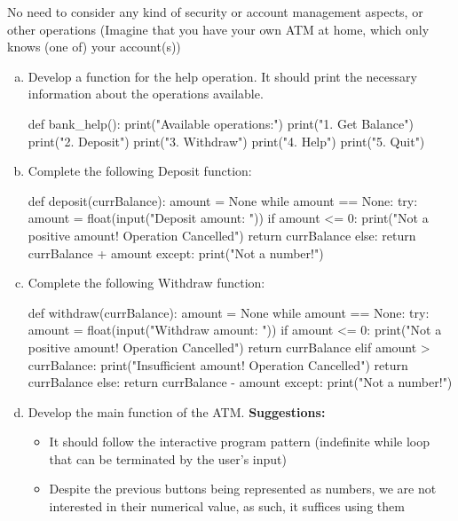 \documentclass[12pt]{article}
\begin{document}
\vspace{-6mm}

\noindent No need to consider any kind of security or account management 
aspects, or other operations (Imagine that you have your own ATM at home, which
only knows (one of) your account(s))

\begin{enumerate}[a)]
  \item Develop a function for the help operation. It should print the necessary
    information about the operations available.
\begin{pythonlst}
def bank_help():
  print("Available operations:")
  print("1. Get Balance")
  print("2. Deposit")
  print("3. Withdraw")
  print("4. Help")
  print("5. Quit")
\end{pythonlst}
  \item Complete the following Deposit function:
  \begin{pythonlst}
def deposit(currBalance):
  amount = None
  while amount == None:
    try:
      amount = float(input("Deposit amount: "))
      if amount <= 0:
        print("Not a positive amount! Operation Cancelled")
        return currBalance
      else:
        return currBalance + amount
    except:
      print("Not a number!")
  \end{pythonlst}
  \vspace{-4mm}
  \item Complete the following Withdraw function:
  \begin{pythonlst}
def withdraw(currBalance):
  amount = None
  while amount == None:
    try:
      amount = float(input("Withdraw amount: "))
      if amount <= 0:
        print("Not a positive amount! Operation Cancelled")
        return currBalance
      elif amount > currBalance:
        print("Insufficient amount! Operation Cancelled")
        return currBalance
      else:
        return currBalance - amount
    except:
      print("Not a number!")
  \end{pythonlst}
  \item Develop the main function of the ATM. 
    \textbf{Suggestions:} \begin{itemize}
      \item It should follow the interactive program pattern (indefinite while 
        loop that can be terminated by the user's input)
      \item Despite the previous buttons being represented as numbers, we are 
        not interested in their numerical value, as such, it suffices using them

\end{itemize}
\end{enumerate}
\end{document}
